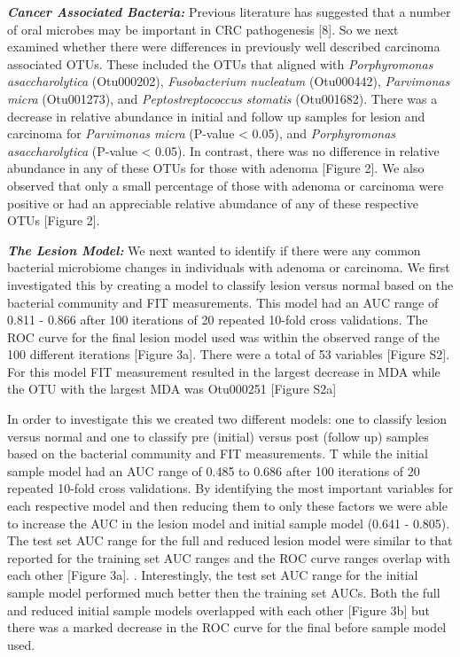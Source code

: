 \documentclass[12pt,]{article}
\begin{document}
\textbf{\emph{Cancer Associated Bacteria:}} Previous literature has
suggested that a number of oral microbes may be important in CRC
pathogenesis {[}8{]}. So we next examined whether there were differences
in previously well described carcinoma associated OTUs. These included
the OTUs that aligned with \emph{Porphyromonas asaccharolytica}
(Otu000202), \emph{Fusobacterium nucleatum} (Otu000442),
\emph{Parvimonas micra} (Otu001273), and \emph{Peptostreptococcus
stomatis} (Otu001682). There was a decrease in relative abundance in
initial and follow up samples for lesion and carcinoma for
\emph{Parvimonas micra} (P-value \textless{} 0.05), and
\emph{Porphyromonas asaccharolytica} (P-value \textless{} 0.05). In
contrast, there was no difference in relative abundance in any of these
OTUs for those with adenoma {[}Figure 2{]}. We also observed that only a
small percentage of those with adenoma or carcinoma were positive or had
an appreciable relative abundance of any of these respective OTUs
{[}Figure 2{]}.

\textbf{\emph{The Lesion Model:}} We next wanted to identify if there
were any common bacterial microbiome changes in individuals with adenoma
or carcinoma. We first investigated this by creating a model to classify
lesion versus normal based on the bacterial community and FIT
measurements. This model had an AUC range of 0.811 - 0.866 after 100
iterations of 20 repeated 10-fold cross validations. The ROC curve for
the final lesion model used was within the observed range of the 100
different iterations {[}Figure 3a{]}. There were a total of 53 variables
{[}Figure S2{]}. For this model FIT measurement resulted in the largest
decrease in MDA while the OTU with the largest MDA was Otu000251
{[}Figure S2a{]}

In order to investigate this we created two different models: one to
classify lesion versus normal and one to classify pre (initial) versus
post (follow up) samples based on the bacterial community and FIT
measurements. T while the initial sample model had an AUC range of 0.485
to 0.686 after 100 iterations of 20 repeated 10-fold cross validations.
By identifying the most important variables for each respective model
and then reducing them to only these factors we were able to increase
the AUC in the lesion model and initial sample model (0.641 - 0.805).\\
The test set AUC range for the full and reduced lesion model were
similar to that reported for the training set AUC ranges and the ROC
curve ranges overlap with each other {[}Figure 3a{]}. . Interestingly,
the test set AUC range for the initial sample model performed much
better then the training set AUCs. Both the full and reduced initial
sample models overlapped with each other {[}Figure 3b{]} but there was a
marked decrease in the ROC curve for the final before sample model used.
\end{document}
